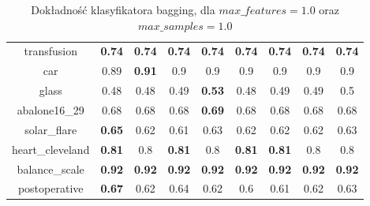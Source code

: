\begin{table}[H]
\begin{center}
{\begin{tabular}{c|cccccccc}
				transfusion&\textbf{0.74}&\textbf{0.74}&\textbf{0.74}&\textbf{0.74}&\textbf{0.74}&\textbf{0.74}&\textbf{0.74}&\textbf{0.74}\\%
				
				car&0.89&\textbf{0.91}&0.9&0.9&0.9&0.9&0.9&0.9\\%
				
				glass&0.48&0.48&0.49&\textbf{0.53}&0.48&0.49&0.49&0.5\\%
				
				abalone16\_29&0.68&0.68&0.68&\textbf{0.69}&0.68&0.68&0.68&0.68\\%
				
				solar\_flare&\textbf{0.65}&0.62&0.61&0.63&0.62&0.62&0.62&0.63\\%
				
				heart\_cleveland&\textbf{0.81}&0.8&\textbf{0.81}&0.8&\textbf{0.81}&\textbf{0.81}&0.8&0.8\\%
				
				balance\_scale&\textbf{0.92}&\textbf{0.92}&\textbf{0.92}&\textbf{0.92}&\textbf{0.92}&\textbf{0.92}&\textbf{0.92}&\textbf{0.92}\\%
				
				postoperative&\textbf{0.67}&0.62&0.64&0.62&0.6&0.61&0.62&0.63\\%
				
			\end{tabular}}
			\caption{Dokładność klasyfikatora bagging, dla $max\_features = 1.0$ oraz $max\_samples = 1.0$}
			\label{bagging_11}
		\end{center}
	\end{table}
